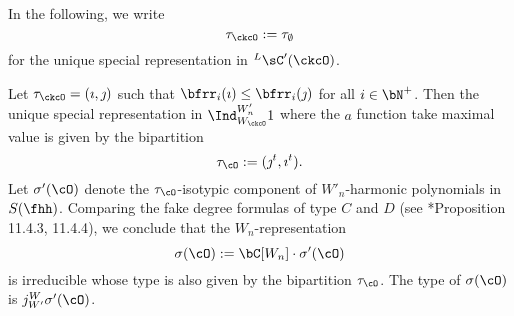 \documentclass[counting_main.tex]{subfiles}
\begin{document}
In the following, we write
\[
\tau_{\ckcO}:=\tau_\emptyset
\]
for the unique special
representation in $\LCC(\ckcO)$.



Let $\tau_\ckcO  = (\imath,\jmath)$ such that $\bfrr_i(\imath)\leq \bfrr_i(\jmath)$ for all $i\in \bN^+$.
Then the unique special representation
in $\Ind_{W_\ckcO}^{W'_n} 1$ where the $a$ function take maximal value is given
by the bipartition
\[
  \tau_{\cO}:=(\jmath^t,\imath^t).
\]
Let $\sigma'(\cO)$ denote the $\tau_{\cO}$-isotypic component of $W'_n$-harmonic polynomials in $S(\fhh)$.
Comparing the  fake degree formulas of type $C$ and $D$ (see \cite{Carter}*{Proposition 11.4.3, 11.4.4}), we conclude that
the $W_n$-representation
\begin{equation}\label{eq:sigma.tC}
\sigma(\cO):= \bC[W_n]\cdot \sigma'(\cO)
\end{equation}
is irreducible whose type is also given by the
bipartition $\tau_{\cO}$. The type of $\sigma(\cO)$ is $j_{W'}^{W} \sigma'(\cO)$.
\end{document}
